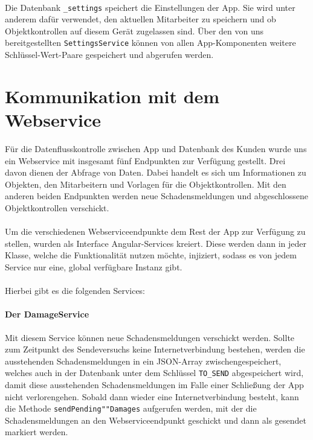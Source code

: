 \documentclass[12pt]{article}
\begin{document}
\paragraph{}Die Datenbank \texttt{\_settings} speichert die Einstellungen der App. Sie wird unter anderem dafür verwendet, den aktuellen Mitarbeiter zu speichern und ob Objektkontrollen auf diesem Gerät zugelassen sind. Über den von uns bereitgestellten \texttt{SettingsService} können von allen App-Komponenten weitere Schlüssel-Wert-Paare gespeichert und abgerufen werden.

\section{Kommunikation mit dem Webservice}
Für die Datenflusskontrolle zwischen App und Datenbank des Kunden wurde uns ein Webservice mit insgesamt fünf Endpunkten zur Verfügung gestellt. Drei davon dienen der Abfrage von Daten. Dabei handelt es sich um Informationen zu Objekten, den Mitarbeitern und Vorlagen für die Objektkontrollen. Mit den anderen beiden Endpunkten werden neue Schadensmeldungen und abgeschlossene Objektkontrollen verschickt.

\paragraph{}Um die verschiedenen Webserviceendpunkte dem Rest der App zur Verfügung zu stellen, wurden als Interface Angular-Services kreiert. Diese werden dann in jeder Klasse, welche die Funktionalität nutzen möchte, injiziert, sodass es von jedem Service nur eine, global verfügbare Instanz gibt.\\ \ \\
Hierbei gibt es die folgenden Services:
\paragraph{Der DamageService}
Mit diesem Service können neue Schadensmeldungen verschickt werden. Sollte zum Zeitpunkt des Sendeversuchs keine Internetverbindung bestehen, werden die ausstehenden Schadensmeldungen in ein JSON-Array zwischengespeichert, welches auch in der Datenbank unter dem Schlüssel \texttt{TO\_SEND} abgespeichert wird, damit diese ausstehenden Schadensmeldungen im Falle einer Schließung der App nicht verlorengehen. Sobald dann wieder eine Internetverbindung besteht, kann die Methode \texttt{sendPending""Damages} aufgerufen werden, mit der die Schadensmeldungen an den Webserviceendpunkt geschickt und dann als gesendet markiert werden.
\end{document}
